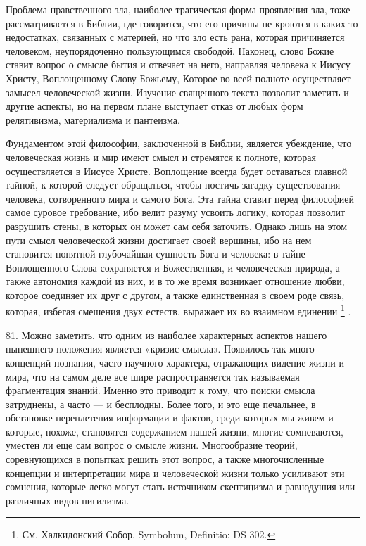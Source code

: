 \documentclass[a5paper,10pt]{article}
\begin{document}
Проблема нравственного зла, наиболее трагическая форма проявления зла, тоже
рассматривается в Библии, где говорится, что его причины не кроются в каких-то
недостатках, связанных с материей, но что зло есть рана, которая причиняется
человеком, неупорядоченно пользующимся свободой. Наконец, слово Божие ставит
вопрос о смысле бытия и отвечает на него, направляя человека к Иисусу Христу,
Воплощенному Слову Божьему, Которое во всей полноте осуществляет замысел
человеческой жизни. Изучение священного текста позволит заметить и другие
аспекты, но на первом плане выступает отказ от любых форм релятивизма,
материализма и пантеизма.

Фундаментом этой философии, заключенной в Библии, является убеждение, что
человеческая жизнь и мир имеют смысл и стремятся к полноте, которая
осуществляется в Иисусе Христе. Воплощение всегда будет оставаться главной
тайной, к которой следует обращаться, чтобы постичь загадку существования
человека, сотворенного мира и самого Бога.  Эта тайна ставит перед философией
самое суровое требование, ибо велит разуму усвоить логику, которая позволит
разрушить стены, в которых он может сам себя заточить. Однако лишь на этом пути
смысл человеческой жизни достигает своей вершины, ибо на нем становится
понятной глубочайшая сущность Бога и человека: в тайне Воплощенного Слова
сохраняется и Божественная, и человеческая природа, а также автономия каждой из
них, и в то же время возникает отношение любви, которое соединяет их друг с
другом, а также единственная в своем роде связь, которая, избегая смешения двух
естеств, выражает их во взаимном единении \footnote{См. Халкидонский Собор,
Symbolum, Definitio: DS 302.} .

81. Можно заметить, что одним из наиболее характерных аспектов нашего нынешнего
положения является «кризис смысла». Появилось так много концепций познания,
часто научного характера, отражающих видение жизни и мира, что на самом деле
все шире распространяется так называемая фрагментация знаний. Именно это
приводит к тому, что поиски смысла затруднены, а часто — и бесплодны. Более
того, и это еще печальнее, в обстановке переплетения информации и фактов, среди
которых мы живем и которые, похоже, становятся содержанием нашей жизни, многие
сомневаются, уместен ли еще сам вопрос о смысле жизни. Многообразие теорий,
соревнующихся в попытках решить этот вопрос, а также многочисленные концепции и
интерпретации мира и человеческой жизни только усиливают эти сомнения, которые
легко могут стать источником скептицизма и равнодушия или различных видов
нигилизма.
\end{document}
